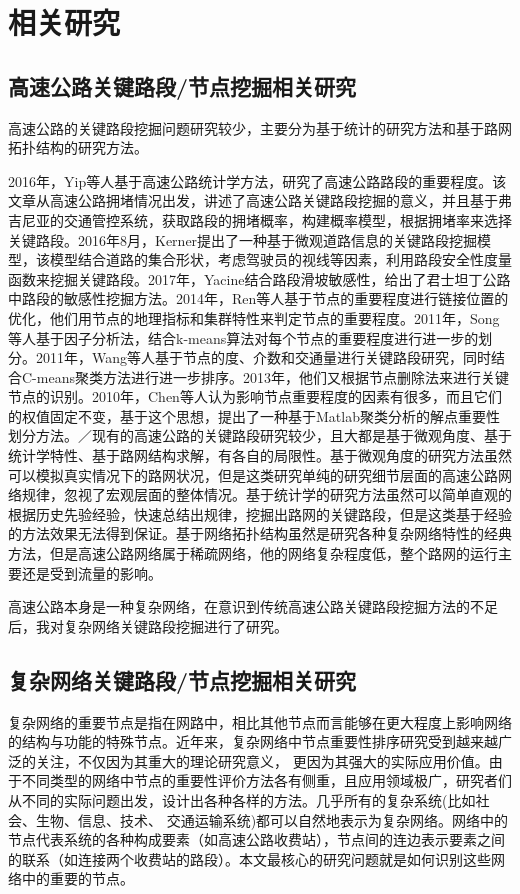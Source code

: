 
\chapter{相关研究}

\section{高速公路关键路段/节点挖掘相关研究}
	高速公路的关键路段挖掘问题研究较少，主要分为基于统计的研究方法和基于路网拓扑结构的研究方法。

	2016年，Yip等人基于高速公路统计学方法\parencite{YipTongji}，研究了高速公路路段的重要程度。该文章从高速公路拥堵情况出发，讲述了高速公路关键路段挖掘的意义，并且基于弗吉尼亚的交通管控系统，获取路段的拥堵概率，构建概率模型，根据拥堵率来选择关键路段。2016年8月，Kerner提出了一种基于微观道路信息的关键路段挖掘模型\parencite{Kerner2015The}，该模型结合道路的集合形状，考虑驾驶员的视线等因素，利用路段安全性度量函数来挖掘关键路段。2017年，Yacine结合路段滑坡敏感性，给出了君士坦丁公路中路段的敏感性挖掘方法\parencite{Yacine2017Landslide}。2014年，Ren等人基于节点的重要程度进行链接位置的优化，他们用节点的地理指标和集群特性来判定节点的重要程度。2011年，Song等人基于因子分析法，结合k-means算法对每个节点的重要程度进行进一步的划分\parencite{Song2011Node}。2011年，Wang等人基于节点的度、介数和交通量进行关键路段研究，同时结合C-means聚类方法进行进一步排序\parencite{Wang2011Signal}。2013年，他们又根据节点删除法来进行关键节点的识别\parencite{Wang2013Calculating}。2010年，Chen等人认为影响节点重要程度的因素有很多，而且它们的权值固定不变，基于这个思想，提出了一种基于Matlab聚类分析的解点重要性划分方法。／现有的高速公路的关键路段研究较少，且大都是基于微观角度、基于统计学特性、基于路网结构求解，有各自的局限性。基于微观角度的研究方法虽然可以模拟真实情况下的路网状况，但是这类研究单纯的研究细节层面的高速公路网络规律，忽视了宏观层面的整体情况。基于统计学的研究方法虽然可以简单直观的根据历史先验经验，快速总结出规律，挖掘出路网的关键路段，但是这类基于经验的方法效果无法得到保证。基于网络拓扑结构虽然是研究各种复杂网络特性的经典方法，但是高速公路网络属于稀疏网络，他的网络复杂程度低，整个路网的运行主要还是受到流量的影响。

	高速公路本身是一种复杂网络，在意识到传统高速公路关键路段挖掘方法的不足后，我对复杂网络关键路段挖掘进行了研究。

\section{复杂网络关键路段/节点挖掘相关研究}
	复杂网络的重要节点是指在网路中，相比其他节点而言能够在更大程度上影响网络的结构与功能的特殊节点。近年来，复杂网络中节点重要性排序研究受到越来越广泛的关注，不仅因为其重大的理论研究意义， 更因为其强大的实际应用价值。由于不同类型的网络中节点的重要性评价方法各有侧重，且应用领域极广，研究者们从不同的实际问题出发，设计出各种各样的方法。几乎所有的复杂系统(比如社会、生物、信息、技术、 交通运输系统)都可以自然地表示为复杂网络。网络中的节点代表系统的各种构成要素（如高速公路收费站），节点间的连边表示要素之间的联系（如连接两个收费站的路段）。本文最核心的研究问题就是如何识别这些网络中的重要的节点。 

